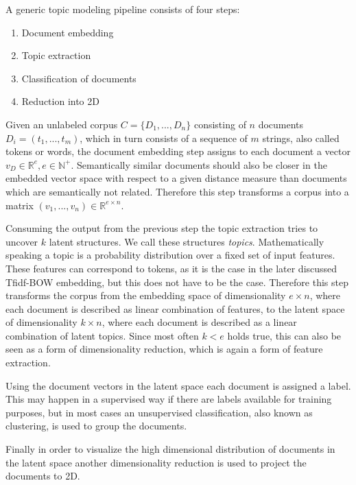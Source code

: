 A generic topic modeling pipeline consists of four steps: 
\begin{enumerate}
	\item Document embedding
	\item Topic extraction
	\item Classification of documents
	\item Reduction into 2D
\end{enumerate}

Given an unlabeled corpus $C = \{D_1, ..., D_n\}$ consisting of $n$ documents $D_i = (t_1, ..., t_m)$, which in turn consists of a sequence of $m$ strings, also called tokens or words, the document embedding step assigns to each document a vector $v_D \in \mathbb{R}^e, e \in \mathbb{N}^+$. Semantically similar documents should also be closer in the embedded vector space with respect to a given distance measure than documents which are semantically not related. Therefore this step transforms a corpus into a matrix $(v_1, ..., v_n) \in \mathbb{R}^{e \times n}$.

Consuming the output from the previous step the topic extraction tries to uncover $k$ latent structures. We call these structures \textit{topics}. Mathematically speaking a topic is a probability distribution over a fixed set of input features. \cite{liuOverviewTopicModeling2016} These features can correspond to tokens, as it is the case in the later discussed Tfidf-BOW embedding, but this does not have to be the case. Therefore this step transforms the corpus from the embedding space of dimensionality $e \times n$, where each document is described as linear combination of features, to the latent space of dimensionality $k \times n$, where each document is described as a linear combination of latent topics. Since most often $k < e$ holds true, this can also be seen as a form of dimensionality reduction, which is again a form of feature extraction.

Using the document vectors in the latent space each document is assigned a label. This may happen in a supervised way if there are labels available for training purposes, but in most cases an unsupervised classification, also known as clustering, is used to group the documents.

Finally in order to visualize the high dimensional distribution of documents in the latent space another dimensionality reduction is used to project the documents to 2D.

